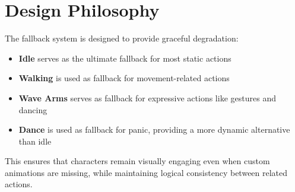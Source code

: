 \documentclass[11pt,letterpaper,oldstylefigures]{memoir}
\begin{document}
\section{Design Philosophy}

The fallback system is designed to provide graceful degradation:

\begin{itemize}
\item \textbf{Idle} serves as the ultimate fallback for most static actions
\item \textbf{Walking} is used as fallback for movement-related actions
\item \textbf{Wave Arms} serves as fallback for expressive actions like gestures and dancing
\item \textbf{Dance} is used as fallback for panic, providing a more dynamic alternative than idle
\end{itemize}

This ensures that characters remain visually engaging even when custom animations are missing, while maintaining logical consistency between related actions.

\printglossaries
\printindex
\end{document}
